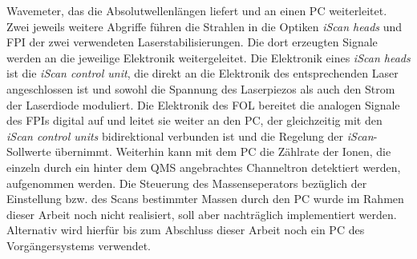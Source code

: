 Wavemeter, das die Absolutwellenlängen liefert und an einen PC weiterleitet.
Zwei jeweils weitere Abgriffe führen die Strahlen in die Optiken \textit{iScan
heads} und FPI der zwei verwendeten Laserstabilisierungen. Die dort erzeugten
Signale werden an die jeweilige Elektronik weitergeleitet. Die Elektronik eines
\textit{iScan heads} ist die \textit{iScan control unit}, die direkt an die
Elektronik des entsprechenden Laser angeschlossen ist und sowohl die Spannung
des Laserpiezos als auch den Strom der Laserdiode moduliert. Die Elektronik des
FOL bereitet die analogen Signale des FPIs digital auf und leitet sie weiter an
den PC, der gleichzeitig mit den \textit{iScan control units} bidirektional
verbunden ist und die Regelung der \textit{iScan}-Sollwerte übernimmt. Weiterhin
kann mit dem PC die Zählrate der Ionen, die einzeln durch ein hinter dem QMS
angebrachtes Channeltron detektiert werden, aufgenommen werden. Die Steuerung
des Massenseperators bezüglich der Einstellung bzw. des Scans bestimmter Massen
durch den PC wurde im Rahmen dieser Arbeit noch nicht realisiert, soll aber
nachträglich implementiert werden. Alternativ wird hierfür bis zum Abschluss
dieser Arbeit noch ein PC des Vorgängersystems verwendet.


